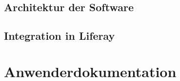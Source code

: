 \section{Architektur der Software}
\section{Integration in Liferay}

\chapter{Anwenderdokumentation}


